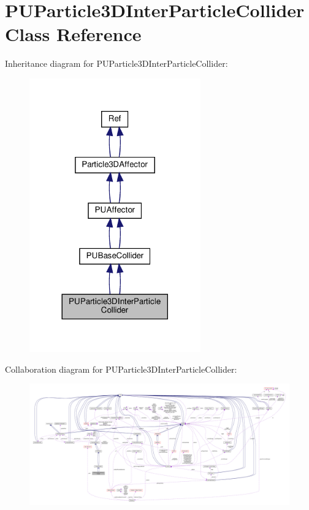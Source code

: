 \hypertarget{classPUParticle3DInterParticleCollider}{}\section{P\+U\+Particle3\+D\+Inter\+Particle\+Collider Class Reference}
\label{classPUParticle3DInterParticleCollider}


Inheritance diagram for P\+U\+Particle3\+D\+Inter\+Particle\+Collider\+:
\nopagebreak
\begin{figure}[H]
\begin{center}
\leavevmode
\includegraphics[width=209pt]{classPUParticle3DInterParticleCollider__inherit__graph}
\end{center}
\end{figure}


Collaboration diagram for P\+U\+Particle3\+D\+Inter\+Particle\+Collider\+:
\nopagebreak
\begin{figure}[H]
\begin{center}
\leavevmode
\includegraphics[width=350pt]{classPUParticle3DInterParticleCollider__coll__graph}
\end{center}
\end{figure}
